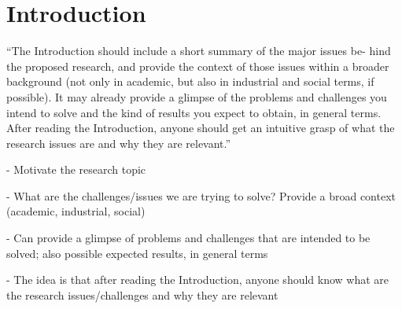 
%

\chapter{Introduction}
\label{cha:introduction}

``The Introduction should include a short summary of the major issues be- hind the proposed research, and provide the context of those issues within a broader background (not only in academic, but also in industrial and social terms, if possible). It may already provide a glimpse of the problems and challenges you intend to solve and the kind of results you expect to obtain, in general terms. After reading the Introduction, anyone should get an intuitive grasp of what the research issues are and why they are relevant.''

- Motivate the research topic

- What are the challenges/issues we are trying to solve? Provide a broad context (academic, industrial, social)

- Can provide a glimpse of problems and challenges that are intended to be solved; also possible expected results, in general terms

- The idea is that after reading the Introduction, anyone should know what are the research issues/challenges and why they are relevant

